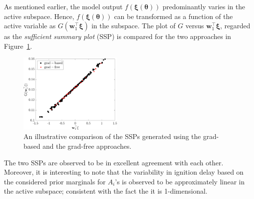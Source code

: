 As mentioned earlier, the model output $f(\bm{\xi}(\bm{\theta}))$ predominantly varies in the active subspace. Hence, 
$f(\bm{\xi}(\bm{\theta}))$ can be transformed as a function of the active variable as $G(\bm{w}_1^\top\bm{\xi})$ in
the subspace. The plot of $G$ versus $\bm{w}_1^\top\bm{\xi}$, regarded as the \textit{sufficient summary plot} (SSP) is 
compared for the two approaches in Figure~\ref{fig:comp_ssp}.
%
\begin{figure}[htbp]
 \begin{center}
  \includegraphics[width=0.45\textwidth]{./Figures/comp_ssp}
\caption{An illustrative comparison of the SSPs generated using the grad-based and the grad-free approaches.}
\label{fig:comp_ssp}
\end{center}
\end{figure}
%
The two SSPs are observed to be in excellent agreement with each other. Moreover, it is interesting to note
that the variability in ignition
delay based on the considered prior marginals for $A_i$'s is observed to be approximately linear in the
active subspace; consistent with the fact the it is 1-dimensional.

